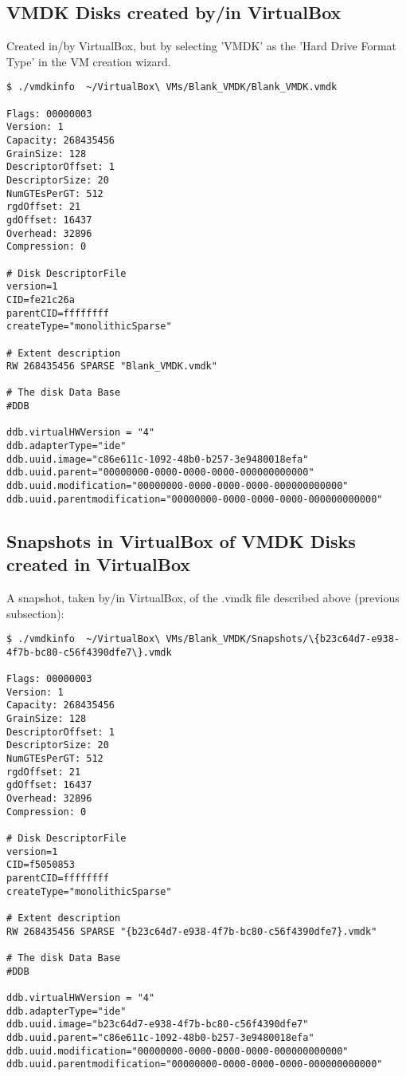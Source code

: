 \documentclass{article}
\begin{document}
\subsection{VMDK Disks created by/in VirtualBox}

Created in/by VirtualBox, but by selecting 'VMDK' as the 'Hard Drive
Format Type' in the VM creation wizard.

\begin{verbatim}
$ ./vmdkinfo  ~/VirtualBox\ VMs/Blank_VMDK/Blank_VMDK.vmdk 

Flags: 00000003
Version: 1
Capacity: 268435456
GrainSize: 128
DescriptorOffset: 1
DescriptorSize: 20
NumGTEsPerGT: 512
rgdOffset: 21
gdOffset: 16437
Overhead: 32896
Compression: 0

# Disk DescriptorFile
version=1
CID=fe21c26a
parentCID=ffffffff
createType="monolithicSparse"

# Extent description
RW 268435456 SPARSE "Blank_VMDK.vmdk"

# The disk Data Base 
#DDB

ddb.virtualHWVersion = "4"
ddb.adapterType="ide"
ddb.uuid.image="c86e611c-1092-48b0-b257-3e9480018efa"
ddb.uuid.parent="00000000-0000-0000-0000-000000000000"
ddb.uuid.modification="00000000-0000-0000-0000-000000000000"
ddb.uuid.parentmodification="00000000-0000-0000-0000-000000000000"
\end{verbatim}

\subsection{Snapshots in VirtualBox of VMDK Disks created in VirtualBox}

A snapshot, taken by/in VirtualBox, of the .vmdk file described above
(previous subsection):

\begin{verbatim}
$ ./vmdkinfo  ~/VirtualBox\ VMs/Blank_VMDK/Snapshots/\{b23c64d7-e938-4f7b-bc80-c56f4390dfe7\}.vmdk 

Flags: 00000003
Version: 1
Capacity: 268435456
GrainSize: 128
DescriptorOffset: 1
DescriptorSize: 20
NumGTEsPerGT: 512
rgdOffset: 21
gdOffset: 16437
Overhead: 32896
Compression: 0

# Disk DescriptorFile
version=1
CID=f5050853
parentCID=ffffffff
createType="monolithicSparse"

# Extent description
RW 268435456 SPARSE "{b23c64d7-e938-4f7b-bc80-c56f4390dfe7}.vmdk"

# The disk Data Base 
#DDB

ddb.virtualHWVersion = "4"
ddb.adapterType="ide"
ddb.uuid.image="b23c64d7-e938-4f7b-bc80-c56f4390dfe7"
ddb.uuid.parent="c86e611c-1092-48b0-b257-3e9480018efa"
ddb.uuid.modification="00000000-0000-0000-0000-000000000000"
ddb.uuid.parentmodification="00000000-0000-0000-0000-000000000000"
\end{verbatim}
\end{document}
